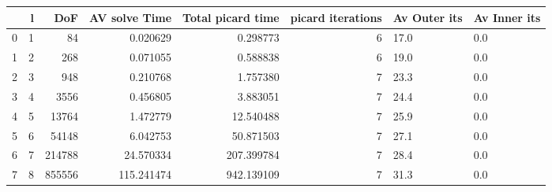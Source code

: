 \begin{tabular}{lrrrrrll}
\toprule
{} &  l &     DoF &  AV solve Time &  Total picard time &  picard iterations & Av Outer its & Av Inner its \\
\midrule
0 &  1 &      84 &       0.020629 &           0.298773 &                  6 &         17.0 &          0.0 \\
1 &  2 &     268 &       0.071055 &           0.588838 &                  6 &         19.0 &          0.0 \\
2 &  3 &     948 &       0.210768 &           1.757380 &                  7 &         23.3 &          0.0 \\
3 &  4 &    3556 &       0.456805 &           3.883051 &                  7 &         24.4 &          0.0 \\
4 &  5 &   13764 &       1.472779 &          12.540488 &                  7 &         25.9 &          0.0 \\
5 &  6 &   54148 &       6.042753 &          50.871503 &                  7 &         27.1 &          0.0 \\
6 &  7 &  214788 &      24.570334 &         207.399784 &                  7 &         28.4 &          0.0 \\
7 &  8 &  855556 &     115.241474 &         942.139109 &                  7 &         31.3 &          0.0 \\
\bottomrule
\end{tabular}
